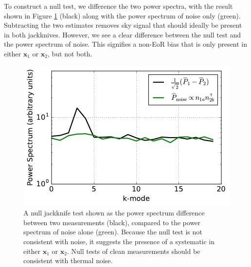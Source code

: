 \documentclass[preprint2,numberedappendix,tighten]{aastex6}
\begin{document}
To construct a null test, we difference the two power spectra, with the result shown in Figure \ref{fig:toy_bias1} (black) along with the power spectrum of noise only (green). Subtracting the two estimates removes sky signal that should ideally be present in both jackknives. However, we see a clear difference between the null test and the power spectrum of 
noise. This signifies a non-EoR bias that is only present in either $\textbf{x}_{1}$ or $\textbf{x}_{2}$, but not both.

\begin{figure}
	\centering
	\includegraphics[trim={0cm 0cm 0cm 0cm},width=\columnwidth]{plots/toy_bias1.pdf}
	\caption{A null jackknife test shown as the power spectrum difference between two measurements (black), compared to the power spectrum of noise alone (green). Because the null test is not consistent with noise, it suggests the 
presence of a systematic in either $\textbf{x}_{1}$ or $\textbf{x}_{2}$. Null tests of clean measurements should be consistent 
with thermal noise.}
	\label{fig:toy_bias1}
\end{figure}
\end{document}
